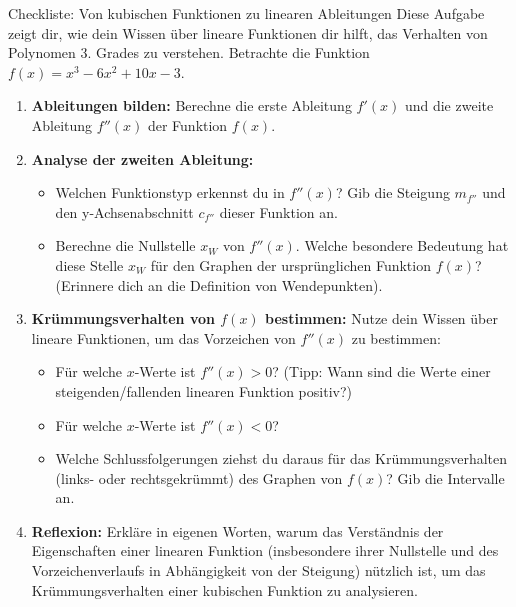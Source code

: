 \begin{aufgabenumgebung}{Checkliste: Von kubischen Funktionen zu linearen Ableitungen}
Diese Aufgabe zeigt dir, wie dein Wissen über lineare Funktionen dir hilft, das Verhalten von Polynomen 3. Grades zu verstehen.
Betrachte die Funktion $f(x) = x^3 - 6x^2 + 10x - 3$.

\begin{enumerate}[label=(\alph*)]
    \item \textbf{Ableitungen bilden:} Berechne die erste Ableitung $f'(x)$ und die zweite Ableitung $f''(x)$ der Funktion $f(x)$.
    \item \textbf{Analyse der zweiten Ableitung:}
    \begin{itemize}
        \item Welchen Funktionstyp erkennst du in $f''(x)$? Gib die Steigung $m_{f''}$ und den y-Achsenabschnitt $c_{f''}$ dieser Funktion an.
        \item Berechne die Nullstelle $x_W$ von $f''(x)$. Welche besondere Bedeutung hat diese Stelle $x_W$ für den Graphen der ursprünglichen Funktion $f(x)$? (Erinnere dich an die Definition von Wendepunkten).
    \end{itemize}
    \item \textbf{Krümmungsverhalten von $f(x)$ bestimmen:}
    Nutze dein Wissen über lineare Funktionen, um das Vorzeichen von $f''(x)$ zu bestimmen:
    \begin{itemize}
        \item Für welche $x$-Werte ist $f''(x) > 0$? (Tipp: Wann sind die Werte einer steigenden/fallenden linearen Funktion positiv?)
        \item Für welche $x$-Werte ist $f''(x) < 0$?
        \item Welche Schlussfolgerungen ziehst du daraus für das Krümmungsverhalten (links- oder rechtsgekrümmt) des Graphen von $f(x)$? Gib die Intervalle an.
    \end{itemize}
    \item \textbf{Reflexion:} Erkläre in eigenen Worten, warum das Verständnis der Eigenschaften einer linearen Funktion (insbesondere ihrer Nullstelle und des Vorzeichenverlaufs in Abhängigkeit von der Steigung) nützlich ist, um das Krümmungsverhalten einer kubischen Funktion zu analysieren.
\end{enumerate}
\end{aufgabenumgebung}


